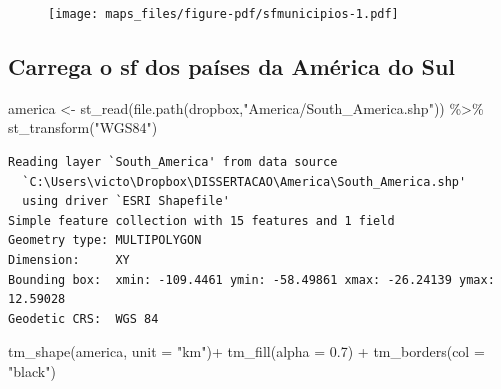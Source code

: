\documentclass[
  letterpaper,
  DIV=11,
  numbers=noendperiod]{scrartcl}
\newenvironment{Shaded}{\begin{snugshade}}{\end{snugshade}}
\newcommand{\AttributeTok}[1]{\textcolor[rgb]{0.40,0.45,0.13}{#1}}
\newcommand{\FloatTok}[1]{\textcolor[rgb]{0.68,0.00,0.00}{#1}}
\newcommand{\FunctionTok}[1]{\textcolor[rgb]{0.28,0.35,0.67}{#1}}
\newcommand{\NormalTok}[1]{\textcolor[rgb]{0.00,0.23,0.31}{#1}}
\newcommand{\OtherTok}[1]{\textcolor[rgb]{0.00,0.23,0.31}{#1}}
\newcommand{\SpecialCharTok}[1]{\textcolor[rgb]{0.37,0.37,0.37}{#1}}
\newcommand{\StringTok}[1]{\textcolor[rgb]{0.13,0.47,0.30}{#1}}
\begin{document}
\begin{figure}[H]

{\centering \texttt{[image: maps\_files/figure-pdf/sfmunicipios-1.pdf]}

}

\end{figure}

\hypertarget{carrega-o-sf-dos-pauxedses-da-amuxe9rica-do-sul}{%
\subsection{Carrega o sf dos países da América do
Sul}\label{carrega-o-sf-dos-pauxedses-da-amuxe9rica-do-sul}}

\begin{Shaded}
\begin{Highlighting}[]
\NormalTok{america }\OtherTok{\textless{}{-}} \FunctionTok{st\_read}\NormalTok{(}\FunctionTok{file.path}\NormalTok{(dropbox,}\StringTok{"America/South\_America.shp"}\NormalTok{)) }\SpecialCharTok{\%\textgreater{}\%} 
  \FunctionTok{st\_transform}\NormalTok{(}\StringTok{"WGS84"}\NormalTok{)}
\end{Highlighting}
\end{Shaded}

\begin{verbatim}
Reading layer `South_America' from data source 
  `C:\Users\victo\Dropbox\DISSERTACAO\America\South_America.shp' 
  using driver `ESRI Shapefile'
Simple feature collection with 15 features and 1 field
Geometry type: MULTIPOLYGON
Dimension:     XY
Bounding box:  xmin: -109.4461 ymin: -58.49861 xmax: -26.24139 ymax: 12.59028
Geodetic CRS:  WGS 84
\end{verbatim}

\begin{Shaded}
\begin{Highlighting}[]
\FunctionTok{tm\_shape}\NormalTok{(america, }\AttributeTok{unit =} \StringTok{"km"}\NormalTok{)}\SpecialCharTok{+}
  \FunctionTok{tm\_fill}\NormalTok{(}\AttributeTok{alpha =} \FloatTok{0.7}\NormalTok{) }\SpecialCharTok{+} 
  \FunctionTok{tm\_borders}\NormalTok{(}\AttributeTok{col =} \StringTok{"black"}\NormalTok{)}
\end{Highlighting}
\end{Shaded}
\end{document}
